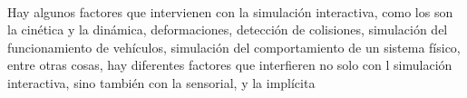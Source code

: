 \documentclass{bmcart}
\begin{document}
\paragraph{}
Hay algunos factores que intervienen con la simulación interactiva, como los son la  cinética y la dinámica, deformaciones, detección de colisiones, simulación del funcionamiento de vehículos, simulación del comportamiento de un sistema físico, entre otras cosas, hay diferentes factores que interfieren no solo con l simulación interactiva, sino también con la sensorial, y la implícita 

\begin{backmatter}

\section*{}

\section*{}

\section*{}



\end{backmatter}
\end{document}
